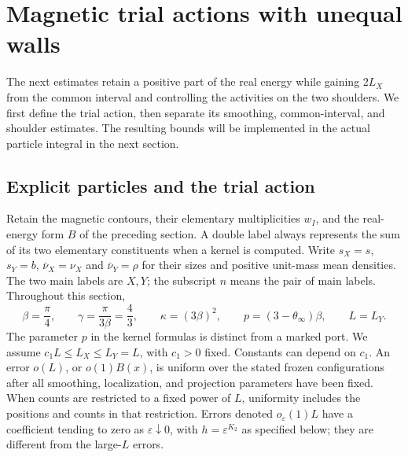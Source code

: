 \section{Magnetic trial actions with unequal walls}
\label{sec:07_magnetic_analysis-trials}

The next estimates retain a positive part of the real energy while gaining
$2L_X$ from the common interval and controlling the activities on the two
shoulders. We first define the trial action, then separate its smoothing,
common-interval, and shoulder estimates. The resulting bounds will be
implemented in the actual particle integral in the next section.

\subsection{Explicit particles and the trial action}

Retain the magnetic contours, their elementary multiplicities \(w_I\),
and the real-energy form \(B\) of the preceding section. A double label
always represents the sum of its two elementary constituents when a kernel
is computed. Write $s_X=s$, $s_Y=b$, $\bar\nu_X=\nu_X$ and
$\bar\nu_Y=\rho$ for their sizes and positive unit-mass mean densities.
The two main labels are \(X,Y\); the subscript \(n\)
means the pair of main labels. Throughout this section,
\[
 \beta=\frac\pi4,\qquad \gamma=\frac\pi{3\beta}=\frac43,
 \qquad \kappa=(3\beta)^2,\qquad
 p=(3-\theta_\infty)\beta,\qquad L=L_Y.
\]
The parameter \(p\) in the kernel formulas is distinct from a marked port.
We assume \(c_1L\le L_X\le L_Y=L\), with \(c_1>0\) fixed.
Constants can depend on \(c_1\). An error \(o(L)\), or \(o(1)B(x)\),
is uniform over the stated frozen configurations after all smoothing,
localization, and projection parameters have been fixed. When counts are
restricted to a fixed power of \(L\), uniformity includes the positions
and counts in that restriction. Errors denoted \(o_\varepsilon(1)L\)
have a coefficient tending to zero as \(\varepsilon\downarrow0\), with
\(h=\varepsilon^{K_2}\) as specified below; they are different from the
large-\(L\) errors.

